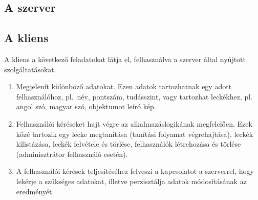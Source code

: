 \documentclass[11pt, a4paper]{article}
\begin{document}
    \subsection{A szerver}
    
    \subsection{A kliens}
    \label{sec:kliens}
    A kliens a következő feladatokat látja el, felhasználva a szerver által nyújtott szolgáltatásokat.
    \begin{enumerate}
    	\item Megjelenít különböző adatokat. Ezen adatok tartozhatnak egy adott felhasználóhoz, pl.~név, pontszám, tudásszint, vagy tartozhat leckékhez, pl. angol szó, magyar szó, objektumot leíró kép.
    	\item Felhasználói kéréseket hajt végre az alkalmazáslogikának megfelelően. Ezek közé tartozik egy lecke megtanítása (tanítási folyamat végrehajtása), leckék kilistázása, leckék felvétele és törlése, felhasználók létrehozása és törlése (adminisztrátor felhasználó esetén).
    	\item A felhasználói kérések teljesítéséhez felveszi a kapcsolatot a szerverrel, hogy lekérje a szükséges adatokat, illetve perzisztálja adatok módosításának az eredményét.
    \end{enumerate}
\end{document}
